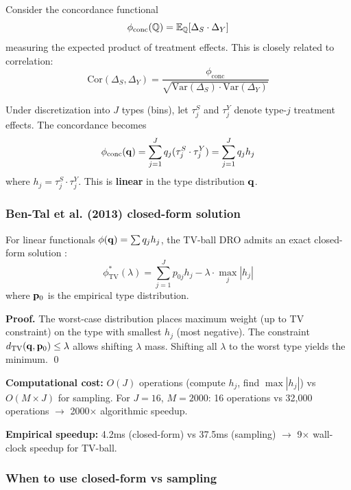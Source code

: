 \documentclass{article}
\begin{document}
Consider the concordance functional
\begin{equation}
    \phi_{\mathrm{conc}}(\mathbb{Q}) = \mathbb{E}_{\mathbb{Q}}[\Delta_S \cdot \Delta_Y]
\end{equation}
measuring the expected product of treatment effects. This is closely related to correlation:
\begin{equation}
    \text{Cor}(\Delta_S, \Delta_Y) = \frac{\phi_{\mathrm{conc}}}{\sqrt{\text{Var}(\Delta_S) \cdot \text{Var}(\Delta_Y)}}
\end{equation}

Under discretization into $J$ types (bins), let $\tau_j^S$ and $\tau_j^Y$ denote type-$j$ treatment effects. The concordance becomes
\begin{equation}
    \phi_{\mathrm{conc}}(\mathbf{q}) = \sum_{j=1}^J q_j (\tau_j^S \cdot \tau_j^Y) = \sum_{j=1}^J q_j h_j
\end{equation}
where $h_j = \tau_j^S \cdot \tau_j^Y$. This is \textbf{linear} in the type distribution $\mathbf{q}$.

\subsubsection{Ben-Tal et al. (2013) closed-form solution}

For linear functionals $\phi(\mathbf{q}) = \sum q_j h_j$, the TV-ball DRO admits an exact closed-form solution \cite{bentalnemirovski2013}:
\begin{equation}
    \phi_{\mathrm{TV}}^*(\lambda) = \sum_{j=1}^J p_{0j} h_j - \lambda \cdot \max_j |h_j|
\end{equation}
where $\mathbf{p}_0$ is the empirical type distribution.

\textbf{Proof.} The worst-case distribution places maximum weight (up to TV constraint) on the type with smallest $h_j$ (most negative). The constraint $d_{\mathrm{TV}}(\mathbf{q}, \mathbf{p}_0) \leq \lambda$ allows shifting $\lambda$ mass. Shifting all $\lambda$ to the worst type yields the minimum. \qed

\textbf{Computational cost:} $O(J)$ operations (compute $h_j$, find $\max|h_j|$) vs $O(M \times J)$ for sampling. For $J=16$, $M=2000$: 16 operations vs 32,000 operations $\rightarrow$ 2000$\times$ algorithmic speedup.

\textbf{Empirical speedup:} 4.2ms (closed-form) vs 37.5ms (sampling) $\rightarrow$ 9$\times$ wall-clock speedup for TV-ball.

\subsubsection{When to use closed-form vs sampling}
\end{document}
